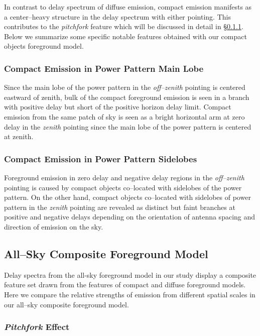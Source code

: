 \documentclass[preprint2,iop,numberedappendix]{emulateapj}
\begin{document}
In contrast to delay spectrum of diffuse emission, compact emission manifests as a center--heavy structure in the delay spectrum with either pointing. This contributes to the {\it pitchfork} feature which will be discussed in detail in \S\ref{sec:pitchfork}. Below we summarize some specific notable features obtained with our compact objects foreground model.

\subsubsection{Compact Emission in Power Pattern Main Lobe}\label{sec:csm-main-lobe}

Since the main lobe of the power pattern in the {\it off--zenith} pointing is centered eastward of zenith, bulk of the compact foreground emission is seen in a branch with positive delay but short of the positive horizon delay limit. Compact emission from the same patch of sky is seen as a bright horizontal arm at zero delay in the {\it zenith} pointing since the main lobe of the power pattern is centered at zenith. 

\subsubsection{Compact Emission in Power Pattern Sidelobes}\label{sec:csm-side-lobe}

Foreground emission in zero delay and negative delay regions in the {\it off--zenith} pointing is caused by compact objects co--located with sidelobes of the power pattern. On the other hand, compact objects co--located with sidelobes of power pattern in the {\it zenith} pointing are revealed as distinct but faint branches at positive and negative delays depending on the orientation of antenna spacing and direction of emission on the sky. 

\subsection{All--Sky Composite Foreground Model}\label{sec:composite}

Delay spectra from the all-sky foreground model in our study display a composite feature set drawn from the features of compact and diffuse foreground models. Here we compare the relative strengths of emission from different spatial scales in our all--sky composite foreground model. 

\subsubsection{{\it Pitchfork} Effect}\label{sec:pitchfork}
\end{document}
